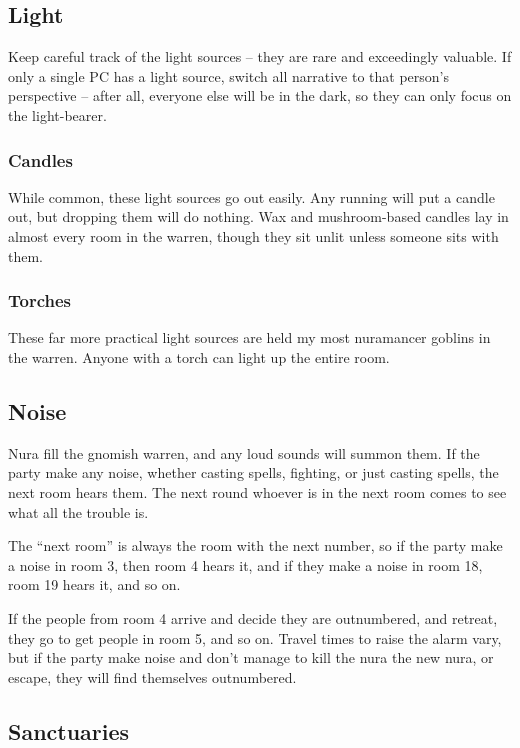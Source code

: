 \begin{multicols}{2}
\subsection{Light}

Keep careful track of the light sources -- they are rare and exceedingly valuable.
If only a single PC has a light source, switch all narrative to that person's perspective -- after all, everyone else will be in the dark, so they can only focus on the light-bearer.

\subsubsection{Candles}

While common, these light sources go out easily.
Any running will put a candle out, but dropping them will do nothing.
Wax and mushroom-based candles lay in almost every room in the warren, though they sit unlit unless someone sits with them.

\subsubsection{Torches}

These far more practical light sources are held my most nuramancer goblins in the warren.
Anyone with a torch can light up the entire room.

\subsection{Noise}

Nura fill the gnomish warren, and any loud sounds will summon them.
If the party make any noise, whether casting spells, fighting, or just casting spells, the next room hears them.
The next round whoever is in the next room comes to see what all the trouble is.

The ``next room'' is always the room with the next number, so if the party make a noise in room 3, then room 4 hears it, and if they make a noise in room 18, room 19 hears it, and so on.

If the people from room 4 arrive and decide they are outnumbered, and retreat, they go to get people in room 5, and so on.
Travel times to raise the alarm vary, but if the party make noise and don't manage to kill the nura the new nura, or escape, they will find themselves outnumbered.

\subsection{Sanctuaries}


\end{multicols}
